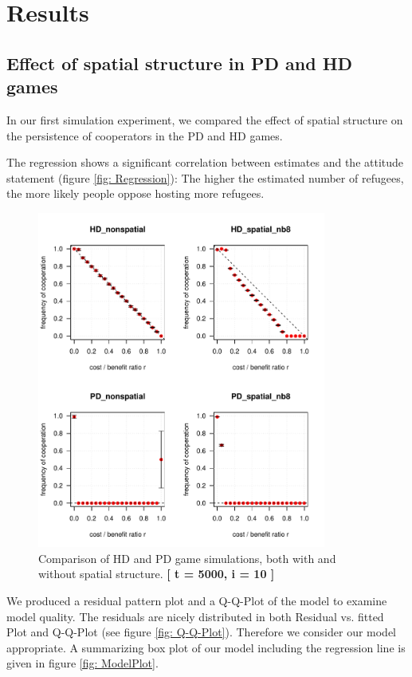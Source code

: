 \section{Results}


\subsection{Effect of spatial structure in PD and HD games}
In our first simulation experiment, we compared the effect of spatial structure on the persistence of cooperators in the PD and HD games.





The regression shows a significant correlation between estimates and the attitude statement (figure \ref{fig: Regression}): The higher the estimated number of refugees, the more likely people oppose hosting more refugees.



\begin{figure}
	\centering 
	\includegraphics[width=9.5cm]{task1_4plot}
	\caption{Comparison of HD and PD game simulations, both with and without spatial structure.  \textbf{[ t = 5000, i = 10 ]} }\label{fig: task1_4plot}
\end{figure}


We produced a residual pattern plot and a Q-Q-Plot of the model to examine model quality. The residuals are nicely distributed in both Residual vs. fitted Plot and Q-Q-Plot (see figure \ref{fig: Q-Q-Plot}). Therefore we consider our model appropriate.
A summarizing box plot of our model including the regression line is given in figure \ref{fig: ModelPlot}.


